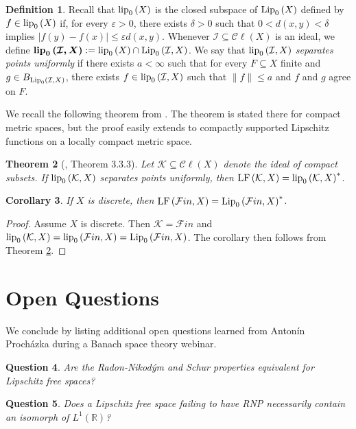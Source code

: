 \documentclass[12pt]{amsart}
\newtheorem{theorem}{Theorem}[section]
\newtheorem{corollary}[theorem]{Corollary}
\newtheorem{question}[theorem]{Question}
\theoremstyle{definition}
\newtheorem{definition}[theorem]{Definition}
\numberwithin{equation}{section}
\def \K {\mathcal{K}}
\def \F {\mathcal{F}in}
\def \R {\mathbb{R}}
\def \I {\mathcal{I}}
\def \sbs {\subseteq}
\def \eps {\varepsilon}
\newcommand{\Cl}[1]{\mathcal{C}\ell\left(#1\right)}
\begin{document}
\begin{definition}
Recall that $\lip{X}$ is the closed subspace of $\Lip{X}$ defined by $f \in \lip{X}$ if, for every $\eps>0$, there exists $\delta > 0$ such that $0<d(x,y)<\delta$ implies $|f(y)-f(x)| \leq \eps d(x,y)$. Whenever $\I \sbs \Cl{X}$ is an ideal, we define $\boldsymbol{\lip{\I}{X}} := \lip{X} \cap \Lip{\I}{X}$. We say that $\lip{\I}{X}$ \emph{separates points uniformly} if there exists $a < \infty$ such that for every $F \sbs X$ finite and $g \in B_{\Lip{\I}{X}}$, there exists $f \in \lip{\I}{X}$ such that $\|f\| \leq a$ and $f$ and $g$ agree on $F$.
\end{definition}

We recall the following theorem from \cite{W}. The theorem is stated there for compact metric spaces, but the proof easily extends to compactly supported Lipschitz functions on a locally compact metric space.

\begin{theorem}[\cite{W}, Theorem 3.3.3] \label{thm:predual}
Let $\K \sbs \Cl{X}$ denote the ideal of compact subsets. If $\lip{\K}{X}$ separates points uniformly, then $\LF{\K}{X} = \lip{\K}{X}^*$.
\end{theorem}

\begin{corollary} \label{cor:predual}
If $X$ is discrete, then $\LF{\F}{X} = \Lip{\F}{X}^*$.
\end{corollary}

\begin{proof}
Assume $X$ is discrete. Then $\K = \F$ and \\ $\lip{\K}{X} = \lip{\F}{X} = \Lip{\F}{X}$. The corollary then follows from Theorem \ref{thm:predual}.
\end{proof}

\section{Open Questions}
We conclude by listing additional open questions learned from Anton\'in Proch\'azka during a Banach space theory webinar.

\begin{question}
Are the Radon-Nikod\'ym and Schur properties equivalent for Lipschitz free spaces?
\end{question}

\begin{question}
Does a Lipschitz free space failing to have RNP necessarily contain an isomorph of $L^1(\R)$?
\end{question}
\end{document}
